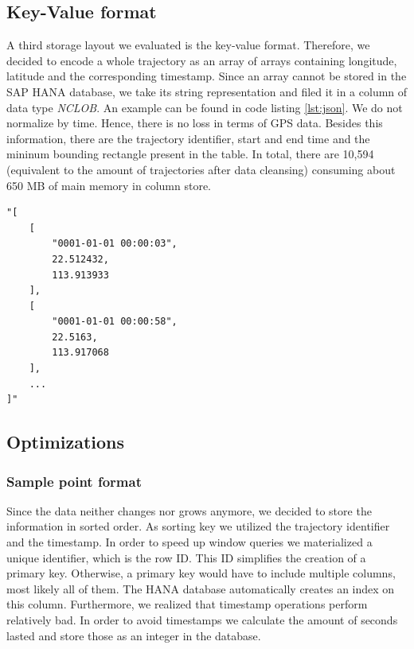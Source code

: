 \documentclass[10pt]{sig-alternate}
\begin{document}
\subsection{Key-Value format}

A third storage layout we evaluated is the key-value format. Therefore, we decided to encode a whole trajectory as an array of arrays containing longitude, latitude and the corresponding timestamp. Since an array cannot be stored in the SAP HANA database, we take its string representation and filed it in a column of data type \textit{NCLOB}. An example can be found in code listing \ref{lst:json}. We do not normalize by time. Hence, there is no loss in terms of GPS data. Besides this information, there are the trajectory identifier, start and end time and the mininum bounding rectangle present in the table. In total, there are 10,594 (equivalent to the amount of trajectories after data cleansing) consuming about 650 MB of main memory in column store.

\lstset{language=json}
\begin{minipage}{0.45\textwidth}
\begin{lstlisting}[frame=single, firstnumber=1, caption=Key-Value format example entry,label=lst:json]
"[
    [
        "0001-01-01 00:00:03",
        22.512432,
        113.913933
    ],
    [
        "0001-01-01 00:00:58",
        22.5163,
        113.917068
    ],
    ...
]"
\end{lstlisting}
\end{minipage}


\subsection{Optimizations}

\subsubsection{Sample point format}

Since the data neither changes nor grows anymore, we decided to store the information in sorted order. As sorting key we utilized the trajectory identifier and the timestamp. In order to speed up window queries we materialized a unique identifier, which is the row ID. This ID simplifies the creation of a primary key. Otherwise, a primary key would have to include multiple columns, most likely all of them. The HANA database automatically creates an index on this column. Furthermore, we realized that timestamp operations perform relatively bad. In order to avoid timestamps we calculate the amount of seconds lasted and store those as an integer in the database.
\end{document}
